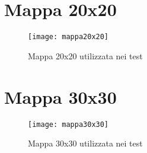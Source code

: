 \section{Mappa 20x20}
\begin{figure}[h!tp]
  \texttt{[image: mappa20x20]}
  \caption{Mappa 20x20 utilizzata nei test}
  \label{fig:figure15}
\end{figure}
\newpage
\section{Mappa 30x30}
\begin{figure}[h!tp]
  \texttt{[image: mappa30x30]}
  \caption{Mappa 30x30 utilizzata nei test}
  \label{fig:figure16}
\end{figure}